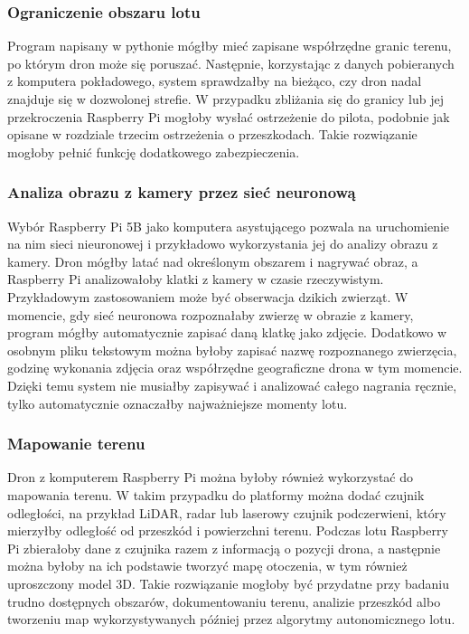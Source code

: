 \documentclass[a4paper,12pt]{book}
\begin{document}
    \subsubsection*{Ograniczenie obszaru lotu}
        Program napisany w pythonie mógłby mieć zapisane współrzędne granic terenu, po którym dron może się poruszać. Następnie, korzystając z danych pobieranych z komputera pokładowego, 
        system sprawdzałby na bieżąco, czy dron nadal znajduje się w dozwolonej strefie. W przypadku zbliżania się do granicy lub jej przekroczenia Raspberry Pi mogłoby wysłać ostrzeżenie 
        do pilota, podobnie jak opisane w rozdziale trzecim ostrzeżenia o przeszkodach. Takie rozwiązanie mogłoby pełnić funkcję dodatkowego zabezpieczenia.
    \subsubsection*{Analiza obrazu z kamery przez sieć neuronową}
        Wybór Raspberry Pi 5B jako komputera asystującego pozwala na uruchomienie na nim sieci nieuronowej i przykładowo wykorzystania jej do analizy obrazu z kamery. Dron mógłby latać nad określonym obszarem 
        i nagrywać obraz, a Raspberry Pi analizowałoby klatki z kamery w czasie rzeczywistym. Przykładowym zastosowaniem może być obserwacja dzikich zwierząt. W momencie, gdy sieć 
        neuronowa rozpoznałaby zwierzę w obrazie z kamery, program mógłby automatycznie zapisać daną klatkę jako zdjęcie. Dodatkowo w osobnym pliku tekstowym można byłoby zapisać 
        nazwę rozpoznanego zwierzęcia, godzinę wykonania zdjęcia oraz współrzędne geograficzne drona w tym momencie. Dzięki temu system nie musiałby zapisywać i analizować całego 
        nagrania ręcznie, tylko automatycznie oznaczałby najważniejsze momenty lotu.
    \subsubsection*{Mapowanie terenu}
        Dron z komputerem Raspberry Pi można byłoby również wykorzystać do mapowania terenu. W takim przypadku do platformy można dodać czujnik odległości, na przykład LiDAR, 
        radar lub laserowy czujnik podczerwieni, który mierzyłby odległość od przeszkód i powierzchni terenu. Podczas lotu Raspberry Pi zbierałoby dane z czujnika razem z 
        informacją o pozycji drona, a następnie można byłoby na ich podstawie tworzyć mapę otoczenia, w tym również uproszczony model 3D. Takie rozwiązanie mogłoby być 
        przydatne przy badaniu trudno dostępnych obszarów, dokumentowaniu terenu, analizie przeszkód albo tworzeniu map wykorzystywanych później przez algorytmy autonomicznego lotu.
\end{document}

